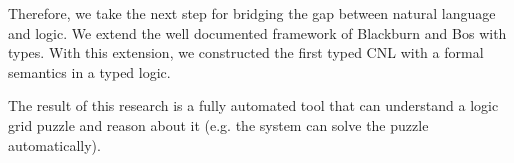 

Therefore, we take the next step for bridging the gap between natural language and logic. We extend the well documented framework of Blackburn and Bos with types. With this extension, we constructed the first typed CNL with a formal semantics in a typed logic.

The result of this research is a fully automated tool that can understand a logic grid puzzle and reason about it (e.g. the system can solve the puzzle automatically).

